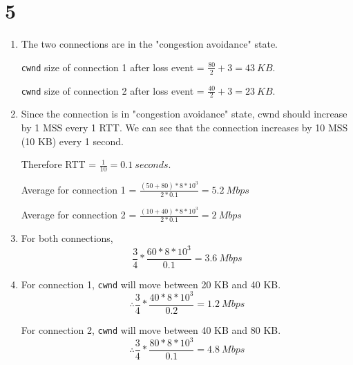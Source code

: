 \section*{5}
\begin{enumerate}
    \item The two connections are in the "congestion avoidance" state.
    
    \texttt{cwnd} size of connection 1 after loss event = $\frac{80}{2} + 3 = \SI{43}{KB}$.
    
    \texttt{cwnd} size of connection 2 after loss event = $\frac{40}{2} + 3 = \SI{23}{KB}$.
    
    \item Since the connection is in "congestion avoidance" state, cwnd should increase by 1 MSS every 1 RTT. We can see that the connection increases by 10 MSS (10 KB) every 1 second.
    
    Therefore RTT = $\frac{1}{10} = \SI{0.1}{seconds}$.
    
    Average for connection 1 = $\frac{(50 + 80) * 8 * 10^3}{2*0.1} = \SI{5.2}{Mbps}$
    
    Average for connection 2 = $\frac{(10 + 40) * 8 * 10^3}{2*0.1} = \SI{2}{Mbps}$
    
    \item For both connections, $$\frac{3}{4} * \frac{60 * 8 * 10^3}{0.1} = \SI{3.6}{Mbps}$$
    
    \item For connection 1, \texttt{cwnd} will move between 20 KB and 40 KB.
    $$\therefore \frac{3}{4} * \frac{40 * 8 * 10^3}{0.2} = \SI{1.2}{Mbps}$$
    
    For connection 2, \texttt{cwnd} will move between 40 KB and 80 KB.
    $$\therefore \frac{3}{4} * \frac{80 * 8 * 10^3}{0.1} = \SI{4.8}{Mbps}$$
\end{enumerate}